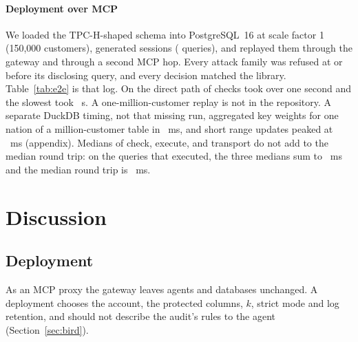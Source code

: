 \documentclass[sigconf,nonacm]{acmart}
\begin{document}
\paragraph{Deployment over MCP}\label{sec:e2e}
We loaded the TPC-H-shaped schema into PostgreSQL~16 at scale factor 1 (150{,}000 customers), generated \Neesessions{} sessions (\Neequeries{} queries), and replayed them through the gateway and through a second MCP hop. Every attack family was refused at or before its disclosing query, and every decision matched the library. Table~\ref{tab:e2e} is that log. On the direct path \Nrevlogover{} of \Nrevlogn{} checks took over one second and the slowest took \Nrevlogmax{}~s. A one-million-customer replay is not in the repository. A separate DuckDB timing, not that missing run, aggregated key weights for one nation of a million-customer table in \Nrevduckms{}~ms, and \Nrevduckhist{} short range updates peaked at \Nrevduckmax{}~ms (appendix). Medians of check, execute, and transport do not add to the median round trip: on the queries that executed, the three medians sum to \Nrevsummed{}~ms and the median round trip is \Nrevrtexec{}~ms.

\begin{table}[!t]
\caption{End-to-end MCP deployment on PostgreSQL, TPC-H scale factor 1 (\Neesessions{} sessions, \Neequeries{} queries). \emph{Parity}: decisions equal to the in-process library. Times in ms, median / 95th percentile.}
\label{tab:e2e}
\centering\scriptsize
\setlength{\tabcolsep}{2.5pt}
\end{table}

\section{Discussion}\label{sec:discussion}

\subsection{Deployment}
As an MCP proxy the gateway leaves agents and databases unchanged. A deployment chooses the account, the protected columns, $k$, strict mode and log retention, and should not describe the audit's rules to the agent (Section~\ref{sec:bird}).
\end{document}
